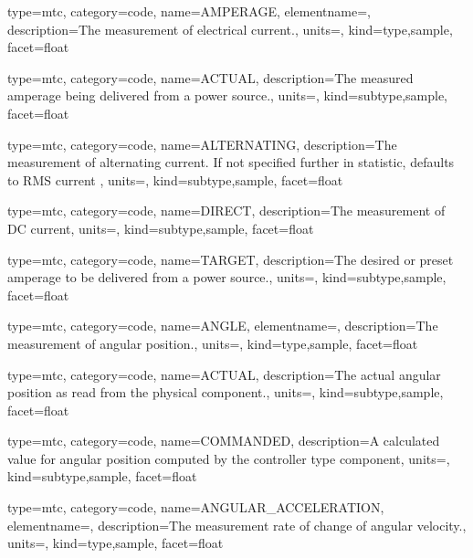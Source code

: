 {
  type=mtc,
  category=code,
  name={AMPERAGE},
  elementname=,
  description={The measurement of electrical current.},
  units=,
  kind={type,sample},
  facet={\gls{float}}
}


{
  type=mtc,
  category=code,
  name={ACTUAL},
  description={The measured amperage being delivered from a power source.},
  units=,
  kind={subtype,sample},
  facet={\gls{float}}
}


{
  type=mtc,
  category=code,
  name={ALTERNATING},
  description={The measurement of alternating current.   If not specified further in statistic, defaults to RMS current  },
  units=,
  kind={subtype,sample},
  facet={\gls{float}}
}


{
  type=mtc,
  category=code,
  name={DIRECT},
  description={The measurement of DC current},
  units=,
  kind={subtype,sample},
  facet={\gls{float}}
}


{
  type=mtc,
  category=code,
  name={TARGET},
  description={The desired or preset amperage to be delivered from a power source.},
  units=,
  kind={subtype,sample},
  facet={\gls{float}}
}


{
  type=mtc,
  category=code,
  name={ANGLE},
  elementname=,
  description={The measurement of angular position.},
  units=,
  kind={type,sample},
  facet={\gls{float}}
}


{
  type=mtc,
  category=code,
  name={ACTUAL},
  description={The actual angular position as read from the physical component.},
  units=,
  kind={subtype,sample},
  facet={\gls{float}}
}


{
  type=mtc,
  category=code,
  name={COMMANDED},
  description={A calculated value for angular position computed by the \gls{controller} type component},
  units=,
  kind={subtype,sample},
  facet={\gls{float}}
}


{
  type=mtc,
  category=code,
  name={ANGULAR\_ACCELERATION},
  elementname=,
  description={The measurement rate of change of angular velocity.},
  units=,
  kind={type,sample},
  facet={\gls{float}}
}


